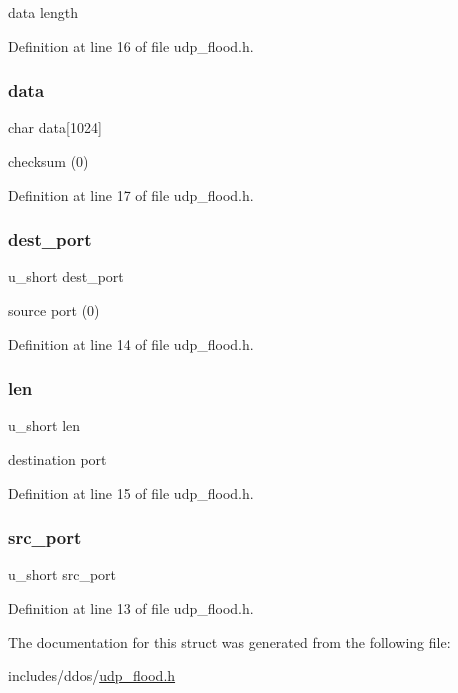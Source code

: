 data length 

Definition at line 16 of file udp\+\_\+flood.\+h.

\mbox{\label{structudphdr_adc6d9f8f602e5f6d0953eb7fdc1a775c}} 
\subsubsection{\texorpdfstring{data}{data}}
{\footnotesize\ttfamily char data\mbox{[}1024\mbox{]}}

checksum (0) 

Definition at line 17 of file udp\+\_\+flood.\+h.

\mbox{\label{structudphdr_af94483ddcebec702e7f980844356a789}} 
\subsubsection{\texorpdfstring{dest\+\_\+port}{dest\_port}}
{\footnotesize\ttfamily u\+\_\+short dest\+\_\+port}

source port (0) 

Definition at line 14 of file udp\+\_\+flood.\+h.

\mbox{\label{structudphdr_aa8fdda3681f58ac74bc52f6b3dc1aebc}} 
\subsubsection{\texorpdfstring{len}{len}}
{\footnotesize\ttfamily u\+\_\+short len}

destination port 

Definition at line 15 of file udp\+\_\+flood.\+h.

\mbox{\label{structudphdr_a422cf8a490ad495e860fd1d07d12c41d}} 
\subsubsection{\texorpdfstring{src\+\_\+port}{src\_port}}
{\footnotesize\ttfamily u\+\_\+short src\+\_\+port}



Definition at line 13 of file udp\+\_\+flood.\+h.



The documentation for this struct was generated from the following file\+:\begin{DoxyCompactItemize}
\item 
includes/ddos/\hyperlink{udp__flood_8h}{udp\+\_\+flood.\+h}\end{DoxyCompactItemize}
